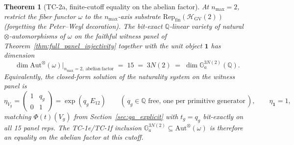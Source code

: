 \documentclass[11pt,a4paper]{article}
\theoremstyle{plain}
\newtheorem{theorem}{Theorem}[section]
\theoremstyle{definition}
\newcommand{\nmax}{n_{\max}}
\newcommand{\HGV}{\mathcal{H}_{\mathrm{GV}}}
\newcommand{\Repcat}{\mathrm{Rep}_{\mathrm{fin}}}
\newcommand{\Aut}{\mathrm{Aut}}
\newcommand{\Ga}{\mathbb{G}_{a}}
\newcommand{\Q}{\mathbb{Q}}
\newcommand{\Phimap}{\Phi}
\newcommand{\fibfun}{\omega}
\begin{document}
\begin{theorem}[TC-2a, finite-cutoff equality on the abelian factor]\label{thm:tc2a_equality}
At $\nmax = 2$, restrict the fiber functor $\fibfun$ to the
$\nmax$-axis substrate $\Repcat(\HGV(2))$ (forgetting the Peter--Weyl
decoration). The bit-exact $\Q$-linear variety of natural
$\otimes$-automorphisms of $\fibfun$ on the faithful witness panel of
Theorem~\ref{thm:full_panel_injectivity} together with the unit
object $\mathbf{1}$ has dimension
\[
\dim \Aut^{\otimes}(\fibfun)\big|_{\nmax = 2,\ \mathrm{abelian\ factor}}
  \;=\; 15
  \;=\; 3 N(2)
  \;=\; \dim \Ga^{3 N(2)}(\Q).
\]
Equivalently, the closed-form solution of the naturality system on
the witness panel is
\[
\eta_{V_{g}} = \begin{pmatrix} 1 & q_{g} \\ 0 & 1 \end{pmatrix}
  = \exp(q_{g}\, E_{12})
\qquad (\, q_{g} \in \Q \text{ free, one per primitive generator}\,),
\qquad \eta_{\mathbf{1}} = 1,
\]
matching $\Phimap(t)(V_{g})$ from Section~\ref{sec:ga_explicit} with
$t_{g} = q_{g}$ bit-exactly on all 15 panel reps. The TC-1e/TC-1f
inclusion $\Ga^{3 N(2)} \subseteq \Aut^{\otimes}(\fibfun)$ is
therefore an equality on the abelian factor at this cutoff.
\end{theorem}
\end{document}

